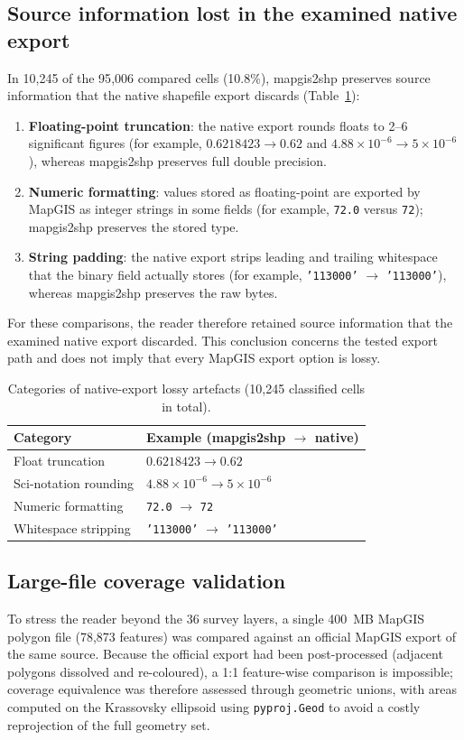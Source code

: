 \documentclass[11pt,a4paper]{article}
\begin{document}
\subsection{Source information lost in the examined native export}
In 10{,}245 of the 95{,}006 compared cells (10.8\%), mapgis2shp preserves source information that the native shapefile export discards (Table~\ref{tab:lossy}):
\begin{enumerate}
  \item \textbf{Floating-point truncation}: the native export rounds floats to 2--6 significant figures (for example, $0.6218423 \rightarrow 0.62$ and $4.88\times10^{-6} \rightarrow 5\times10^{-6}$), whereas mapgis2shp preserves full double precision.
  \item \textbf{Numeric formatting}: values stored as floating-point are exported by MapGIS as integer strings in some fields (for example, \texttt{72.0} versus \texttt{72}); mapgis2shp preserves the stored type.
  \item \textbf{String padding}: the native export strips leading and trailing whitespace that the binary field actually stores (for example, \texttt{'113000\quad'} $\rightarrow$ \texttt{'113000'}), whereas mapgis2shp preserves the raw bytes.
\end{enumerate}
For these comparisons, the reader therefore retained source information that the examined native export discarded. This conclusion concerns the tested export path and does not imply that every MapGIS export option is lossy.

\begin{table}[h]
\centering
\caption{Categories of native-export lossy artefacts (10{,}245 classified cells in total).}
\label{tab:lossy}
\begin{tabular}{ll}
\toprule
Category & Example (mapgis2shp $\rightarrow$ native) \\
\midrule
Float truncation & $0.6218423 \rightarrow 0.62$ \\
Sci-notation rounding & $4.88\times10^{-6} \rightarrow 5\times10^{-6}$ \\
Numeric formatting & \texttt{72.0} $\rightarrow$ \texttt{72} \\
Whitespace stripping & \texttt{'113000\quad'} $\rightarrow$ \texttt{'113000'} \\
\bottomrule
\end{tabular}
\end{table}

\subsection{Large-file coverage validation}
\label{sec:largescale}
To stress the reader beyond the 36 survey layers, a single 400~MB MapGIS polygon file (78{,}873 features) was compared against an official MapGIS export of the same source. Because the official export had been post-processed (adjacent polygons dissolved and re-coloured), a 1:1 feature-wise comparison is impossible; coverage equivalence was therefore assessed through geometric unions, with areas computed on the Krassovsky ellipsoid using \texttt{pyproj.Geod} to avoid a costly reprojection of the full geometry set.
\end{document}
